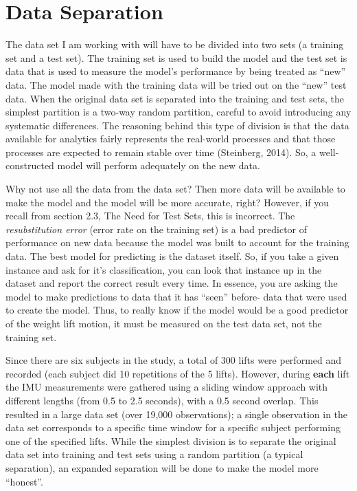 \documentclass[12pt,twoside]{reedthesis}
\begin{document}
  \newpage
  
  \section{Data Separation}\label{data-separation}
  
  The data set I am working with will have to be divided into two sets (a
  training set and a test set). The training set is used to build the
  model and the test set is data that is used to measure the model's
  performance by being treated as ``new'' data. The model made with the
  training data will be tried out on the ``new'' test data. When the
  original data set is separated into the training and test sets, the
  simplest partition is a two-way random partition, careful to avoid
  introducing any systematic differences. The reasoning behind this type
  of division is that the data available for analytics fairly represents
  the real-world processes and that those processes are expected to remain
  stable over time (Steinberg, 2014). So, a well-constructed model will
  perform adequately on the new data.
  
  Why not use all the data from the data set? Then more data will be
  available to make the model and the model will be more accurate, right?
  However, if you recall from section 2.3, The Need for Test Sets, this is
  incorrect. The \emph{resubstitution error} (error rate on the training
  set) is a bad predictor of performance on new data because the model was
  built to account for the training data. The best model for predicting is
  the dataset itself. So, if you take a given instance and ask for it's
  classification, you can look that instance up in the dataset and report
  the correct result every time. In essence, you are asking the model to
  make predictions to data that it has ``seen'' before- data that were
  used to create the model. Thus, to really know if the model would be a
  good predictor of the weight lift motion, it must be measured on the
  test data set, not the training set.
  
  Since there are six subjects in the study, a total of 300 lifts were
  performed and recorded (each subject did 10 repetitions of the 5 lifts).
  However, during \textbf{each} lift the IMU measurements were gathered
  using a sliding window approach with different lengths (from 0.5 to 2.5
  seconds), with a 0.5 second overlap. This resulted in a large data set
  (over 19,000 observations); a single observation in the data set
  corresponds to a specific time window for a specific subject performing
  one of the specified lifts. While the simplest division is to separate
  the original data set into training and test sets using a random
  partition (a typical separation), an expanded separation will be done to
  make the model more ``honest''.
  
\end{document}
